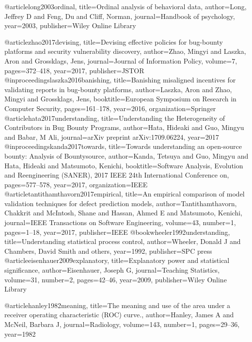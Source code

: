 @article{long2003ordinal,
  title={Ordinal analysis of behavioral data},
  author={Long, Jeffrey D and Feng, Du and Cliff, Norman},
  journal={Handbook of psychology},
  year={2003},
  publisher={Wiley Online Library}
}




@article{zhao2017devising,
  title={Devising effective policies for bug-bounty platforms and security vulnerability discovery},
  author={Zhao, Mingyi and Laszka, Aron and Grossklags, Jens},
  journal={Journal of Information Policy},
  volume={7},
  pages={372--418},
  year={2017},
  publisher={JSTOR}
}
@inproceedings{laszka2016banishing,
  title={Banishing misaligned incentives for validating reports in bug-bounty platforms},
  author={Laszka, Aron and Zhao, Mingyi and Grossklags, Jens},
  booktitle={European Symposium on Research in Computer Security},
  pages={161--178},
  year={2016},
  organization={Springer}
}
@article{hata2017understanding,
  title={Understanding the Heterogeneity of Contributors in Bug Bounty Programs},
  author={Hata, Hideaki and Guo, Mingyu and Babar, M Ali},
  journal={arXiv preprint arXiv:1709.06224},
  year={2017}
}
@inproceedings{kanda2017towards,
  title={Towards understanding an open-source bounty: Analysis of Bountysource},
  author={Kanda, Tetsuya and Guo, Mingyu and Hata, Hideaki and Matsumoto, Kenichi},
  booktitle={Software Analysis, Evolution and Reengineering (SANER), 2017 IEEE 24th International Conference on},
  pages={577--578},
  year={2017},
  organization={IEEE}
}
@article{tantithamthavorn2017empirical,
  title={An empirical comparison of model validation techniques for defect prediction models},
  author={Tantithamthavorn, Chakkrit and McIntosh, Shane and Hassan, Ahmed E and Matsumoto, Kenichi},
  journal={IEEE Transactions on Software Engineering},
  volume={43},
  number={1},
  pages={1--18},
  year={2017},
  publisher={IEEE}
}
@book{wheeler1992understanding,
  title={Understanding statistical process control},
  author={Wheeler, Donald J and Chambers, David Smith and others},
  year={1992},
  publisher={SPC press}
}
@article{eisenhauer2009explanatory,
  title={Explanatory power and statistical significance},
  author={Eisenhauer, Joseph G},
  journal={Teaching Statistics},
  volume={31},
  number={2},
  pages={42--46},
  year={2009},
  publisher={Wiley Online Library}
}

@article{hanley1982meaning,
  title={The meaning and use of the area under a receiver operating characteristic (ROC) curve.},
  author={Hanley, James A and McNeil, Barbara J},
  journal={Radiology},
  volume={143},
  number={1},
  pages={29--36},
  year={1982}
}

